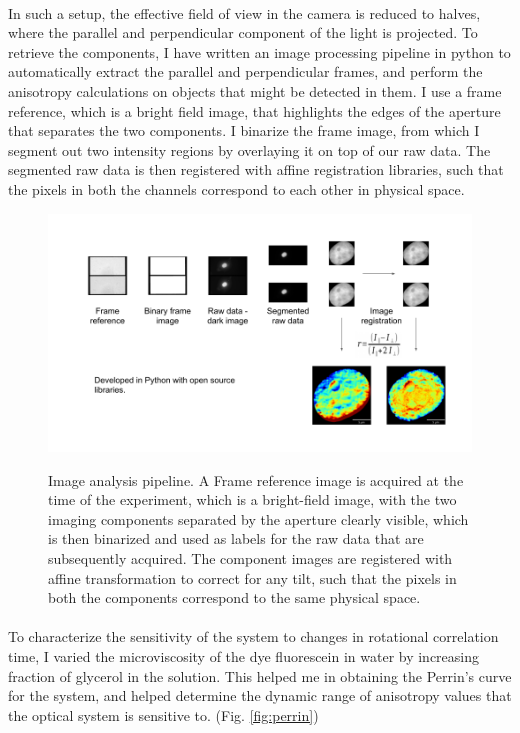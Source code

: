 \paragraph*{} In such a setup, the effective field of view in the camera is reduced to halves, where the parallel and perpendicular component of the light is projected. To retrieve the components, I have written an image processing pipeline in python to automatically extract the parallel and perpendicular frames, and perform the anisotropy calculations on objects that might be detected in them. I use a frame reference, which is a bright field image, that highlights the edges of the aperture that separates the two components. I binarize the frame image, from which I segment out two intensity regions by overlaying it on top of our raw data. The segmented raw data is then registered with affine registration libraries, such that the pixels in both the channels correspond to each other in physical space.

\begin{figure}[!htp]
    {\hfill\includegraphics[clip,width=1\linewidth]{figures/pipeline.png}\hspace*{\fill}}
    \caption{Image analysis pipeline. A Frame reference image is acquired at the time of the experiment, which is a bright-field image, with the two imaging components separated by the aperture clearly visible, which is then binarized and used as labels for the raw data that are subsequently acquired. The component images are registered with affine transformation to correct for any tilt, such that the pixels in both the components correspond to the same physical space.}
    {\label{fig:pipeline}}
\end{figure}

\paragraph*{} To characterize the sensitivity of the system to changes in rotational correlation time, I varied the microviscosity of the dye fluorescein in water by increasing fraction of glycerol in the solution. This helped me in obtaining the Perrin's curve for the system, and helped determine the dynamic range of anisotropy values that the optical system is sensitive to. (Fig. \ref{fig:perrin})


